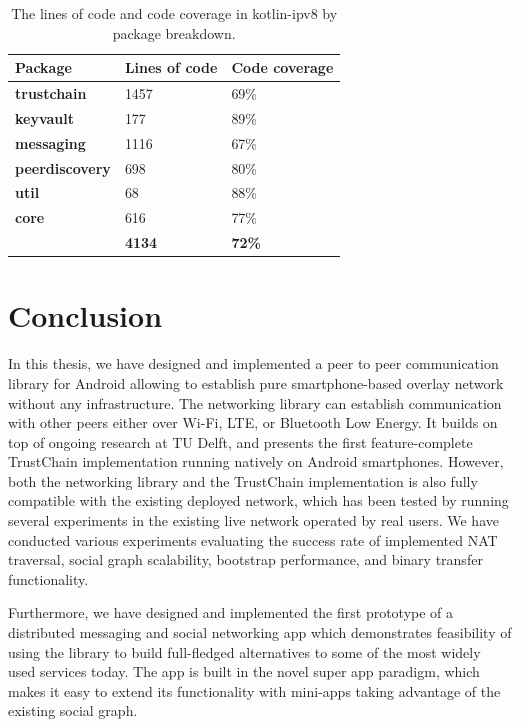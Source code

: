 \begin{table}[h]
    \centering
    \begin{tabular}{ | l | l | l | }
        \hline
        \textbf{Package} & \textbf{Lines of code} & \textbf{Code coverage} \\
        \hline
        \textbf{trustchain} & 1457 & 69\% \\
        \textbf{keyvault} & 177 & 89\% \\
        \textbf{messaging} & 1116 & 67\% \\
        \textbf{peerdiscovery} & 698 & 80\% \\
        \textbf{util} & 68 & 88\% \\
        \textbf{core} & 616 & 77\% \\
        \hline
        & \textbf{4134} & \textbf{72\%} \\
        \hline
    \end{tabular}
    \caption{The lines of code and code coverage in kotlin-ipv8 by package breakdown.}
    \label{codecov}
\end{table}



\chapter{Conclusion}

In this thesis, we have designed and implemented a peer to peer communication library for Android allowing to establish pure smartphone-based overlay network without any infrastructure. The networking library can establish communication with other peers either over Wi-Fi, LTE, or Bluetooth Low Energy. It builds on top of ongoing research at TU Delft, and presents the first feature-complete TrustChain implementation running natively on Android smartphones. However, both the networking library and the TrustChain implementation is also fully compatible with the existing deployed network, which has been tested by running several experiments in the existing live network operated by real users. We have conducted various experiments evaluating the success rate of implemented NAT traversal, social graph scalability, bootstrap performance, and binary transfer functionality.

Furthermore, we have designed and implemented the first prototype of a distributed messaging and social networking app which demonstrates feasibility of using the library to build full-fledged alternatives to some of the most widely used services today. The app is built in the novel super app paradigm, which makes it easy to extend its functionality with mini-apps taking advantage of the existing social graph.

